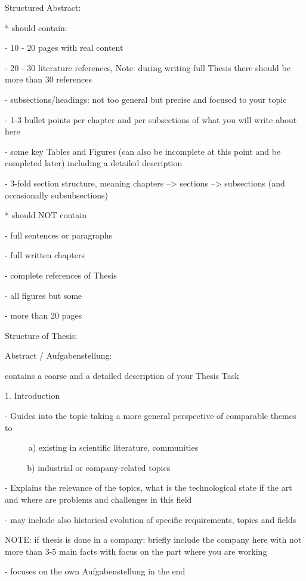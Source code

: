 Structured Abstract:

* should contain:

- 10 - 20 pages with real content

- 20 - 30 literature references, Note: during writing full Thesis there should be more than 30 references

- subsections/headings: not too general but precise and focused to your topic

- 1-3 bullet points per chapter and per subsections of what you will write about here

- some key Tables and Figures (can also be incomplete at this point and be completed later) including a detailed description

- 3-fold section structure, meaning chapters --> sections --> subsections (and occasionally subsubsections)




* should NOT contain

- full sentences or paragraphs

- full written chapters

- complete references of Thesis

- all figures but some

- more than 20 pages




Structure of Thesis:

Abstract / Aufgabenstellung:

contains a coarse and a detailed description of your Thesis Task




1. Introduction

- Guides into the topic taking a more general perspective of comparable themes to

      a) existing in scientific literature, communities

      b) industrial or company-related topics

- Explains the relevance of the topics, what is the technological state if the art and where are problems and challenges in this field

- may include also historical evolution of specific requirements, topics and fields

NOTE: if thesis is done in a company: briefly include the company here with not more than 3-5 main facts with focus on the part where you are working

- focuses on the own Aufgabenstellung in the end

